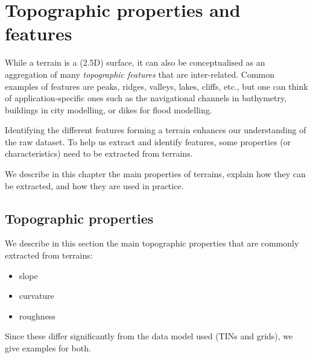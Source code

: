 
\setchapterpreamble[u]{\margintoc}
\graphicspath{{topofeatures/}}


\chapter{Topographic properties and features}%
\label{chap:topofeatures}

While a terrain is a (2.5D) surface, it can also be conceptualised as an aggregation of many \emph{topographic features} that are inter-related.%
Common examples of features are peaks, ridges, valleys, lakes, cliffs, etc., but one can think of application-specific ones such as the navigational channels in bathymetry, buildings in city modelling, or dikes for flood modelling.

Identifying the different features forming a terrain enhances our understanding of the raw dataset.
To help us extract and identify features, some properties (or characteristics) need to be extracted from terrains.

We describe in this chapter the main properties of terrains, explain how they can be extracted, and how they are used in practice.


%
\section{Topographic properties}%
\label{sec:topoproperties}

We describe in this section the main topographic properties that are commonly extracted from terrains:
\begin{itemize}
  \item slope
  \item curvature
  \item roughness
\end{itemize}

Since these differ significantly from the data model used (TINs and grids), we give examples for both.

